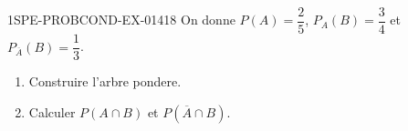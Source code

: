 \begin{exercice}{1SPE-PROBCOND-EX-014}{1}{8}
On donne $P(A) = \dfrac{2}{5}$, $P_A(B) = \dfrac{3}{4}$ et $P_{\overline{A}}(B) = \dfrac{1}{3}$.

\begin{enumerate}
  \item Construire l'arbre pondere.
  \item Calculer $P(A \cap B)$ et $P(\overline{A} \cap B)$.
\end{enumerate}
\end{exercice}
